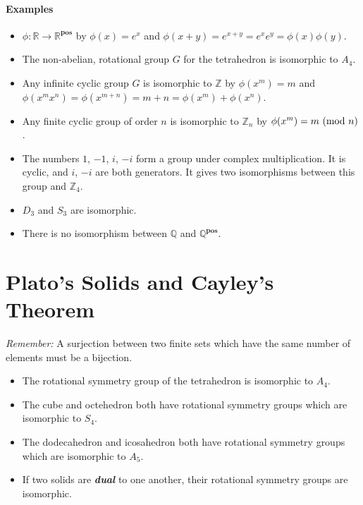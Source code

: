 \documentclass[a4paper,twocolumn,10pt]{article}
\begin{document}
  \paragraph{Examples}
  \begin{itemize}
    \item $\phi\colon \mathbb{R} \rightarrow \mathbb{R}^{\textbf{pos}}$ by
      $\phi{(x)} = e^x$ and $\phi{(x+y)}=e^{x+y}=e^xe^y=\phi{(x)}\phi{(y)}$.
    \item The non-abelian, rotational group $G$ for the tetrahedron is isomorphic to $A_4$.
    \item Any infinite cyclic group $G$ is isomorphic to $\mathbb{Z}$ by
      $\phi{(x^m)} = m$ and $\phi{(x^mx^n)} =
      \phi{(x^{m+n})}=m+n=\phi{(x^m)}+\phi{(x^n)}$.
    \item Any finite cyclic group of order $n$ is isomorphic to $\mathbb{Z}_n$
      by $\phi{(x^m)} = m\ (\text{mod}\ n)$.
    \item The numbers $1$, $-1$, $i$, $-i$ form a group under complex
      multiplication. It is cyclic, and $i$, $-i$ are both generators. It gives
      two isomorphisms between this group and $\mathbb{Z}_4$.
    \item $D_3$ and $S_3$ are isomorphic.
    \item There is no isomorphism between $\mathbb{Q}$ and
      $\mathbb{Q}^{\textbf{pos}}$.
  \end{itemize}

  \section{Plato's Solids and Cayley's Theorem}
  \textit{Remember:} A surjection between two finite sets which have the same
  number of elements must be a bijection.

  \begin{itemize}
    \item The rotational symmetry group of the tetrahedron is isomorphic to
      $A_4$.

    \item The cube and octehedron both have rotational symmetry groups which
      are isomorphic to $S_4$.

    \item The dodecahedron and icosahedron both have rotational symmetry groups
      which are isomorphic to $A_5$.

    \item If two solids are \textbf{\textit{dual}} to one another, their
      rotational symmetry groups are isomorphic.
  \end{itemize}
\end{document}
